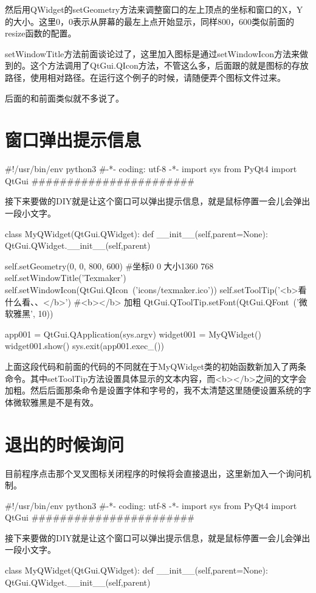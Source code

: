 \documentclass[11pt,oneside]{book}
\begin{document}
\begin{common-format}
然后用QWidget的setGeometry方法来调整窗口的左上顶点的坐标和窗口的X，Y的大小。这里0，0表示从屏幕的最左上点开始显示，同样800，600类似前面的resize函数的配置。

setWindowTitle方法前面谈论过了，这里加入图标是通过setWindowIcon方法来做到的。这个方法调用了QtGui.QIcon方法，不管这么多，后面跟的就是图标的存放路径，使用相对路径。在运行这个例子的时候，请随便弄个图标文件过来。

后面的和前面类似就不多说了。

\section{窗口弹出提示信息}
\begin{python}
#!/usr/bin/env python3
#-*- coding: utf-8 -*-
import sys
from PyQt4  import QtGui
#######################
\end{python}
接下来要做的DIY就是让这个窗口可以弹出提示信息，就是鼠标停置一会儿会弹出一段小文字。
\begin{python}
class MyQWidget(QtGui.QWidget):
    def __init__(self,parent=None):
        QtGui.QWidget.__init__(self,parent)

        self.setGeometry(0, 0, 800, 600)
        #坐标0 0 大小1360 768
        self.setWindowTitle('Texmaker')
        self.setWindowIcon(QtGui.QIcon\
        ('icons/texmaker.ico'))
        self.setToolTip('<b>看什么看、、</b>')
        #<b></b> 加粗
        QtGui.QToolTip.setFont(QtGui.QFont\
        ('微软雅黑', 10))

app001 = QtGui.QApplication(sys.argv)
widget001 = MyQWidget()
widget001.show()
sys.exit(app001.exec_())
\end{python}
上面这段代码和前面的代码的不同就在于MyQWidget类的初始函数新加入了两条命令。其中setToolTip方法设置具体显示的文本内容，而<b></b>之间的文字会加粗。然后后面那条命令是设置字体和字号的，我不太清楚这里随便设置系统的字体微软雅黑是不是有效。

\section{退出的时候询问}
目前程序点击那个叉叉图标关闭程序的时候将会直接退出，这里新加入一个询问机制。
\begin{python}
#!/usr/bin/env python3
#-*- coding: utf-8 -*-
import sys
from PyQt4  import QtGui
#######################
\end{python}
接下来要做的DIY就是让这个窗口可以弹出提示信息，就是鼠标停置一会儿会弹出一段小文字。
\begin{python}
class MyQWidget(QtGui.QWidget):
    def __init__(self,parent=None):
        QtGui.QWidget.__init__(self,parent)


\end{python}
\end{common-format}
\end{document}
